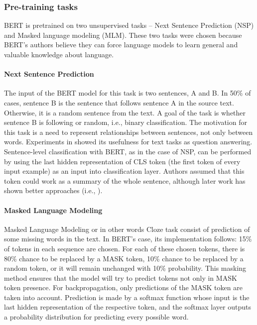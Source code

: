 \subsubsection{Pre-training tasks}
BERT is pretrained on two unsupervised tasks -- Next Sentence Prediction (NSP) and Masked language modeling (MLM). These two tasks were chosen because BERT's authors believe they can force language models to learn general and valuable knowledge about language.
\paragraph{Next Sentence Prediction}
The input of the BERT model for this task is two sentences, A and B. In 50\% of cases, sentence B is the sentence that follows sentence A in the source text. Otherwise, it is a random sentence from the text. A goal of the task is whether sentence B is following or random, i.e., binary classification. The motivation for this task is a need to represent relationships between sentences, not only between words. Experiments in \citep{
Devlin2019} showed its usefulness for text tasks as question answering. Sentence-level classification with BERT, as in the case of NSP, can be performed by using the last hidden representation of CLS token (the first token of every input example) as an input into classification layer. Authors assumed that this token could work as a summary of the whole sentence, although later work has shown better approaches (i.e., \citep{Liu2019}). 
\paragraph{Masked Language Modeling}
Masked Language Modeling or in other words Cloze task \citep{Taylor1953}
consist of prediction of some missing words in the text. In BERT's case, its implementation follows: 15\% of tokens in each sequence are chosen. For each of these chosen tokens, there is 80\% chance to be replaced by a MASK token, 10\% chance to be replaced by a random token, or it will remain unchanged with 10\% probability. This masking method ensures that the model will try to predict tokens not only in MASK token presence. For backpropagation, only predictions of the MASK token are taken into account. Prediction is made by a softmax function %
 whose input is the last hidden representation of the respective token, and the softmax layer outputs a probability distribution for predicting every possible word. 

